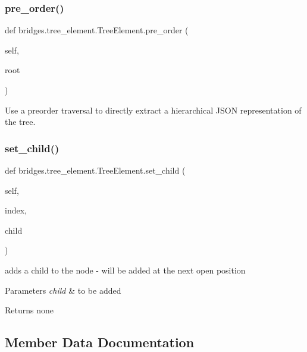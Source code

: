 \subsubsection{\texorpdfstring{pre\+\_\+order()}{pre\_order()}}
{\footnotesize\ttfamily def bridges.\+tree\+\_\+element.\+Tree\+Element.\+pre\+\_\+order (\begin{DoxyParamCaption}\item[{}]{self,  }\item[{}]{root }\end{DoxyParamCaption})}



Use a preorder traversal to directly extract a hierarchical J\+S\+ON representation of the tree. 

\mbox{\label{classbridges_1_1tree__element_1_1_tree_element_aa77f48683b351512dcdf6ec2e90d9a91}} 
\subsubsection{\texorpdfstring{set\+\_\+child()}{set\_child()}}
{\footnotesize\ttfamily def bridges.\+tree\+\_\+element.\+Tree\+Element.\+set\+\_\+child (\begin{DoxyParamCaption}\item[{}]{self,  }\item[{}]{index,  }\item[{}]{child }\end{DoxyParamCaption})}



adds a child to the node -\/ will be added at the next open position 


\begin{DoxyParams}{Parameters}
{\em child} & to be added\\
\hline
\end{DoxyParams}
\begin{DoxyReturn}{Returns}
none 
\end{DoxyReturn}


\subsection{Member Data Documentation}
\mbox{\label{classbridges_1_1tree__element_1_1_tree_element_a620604f4f3571fdf8e3e94c193b86948}} 
